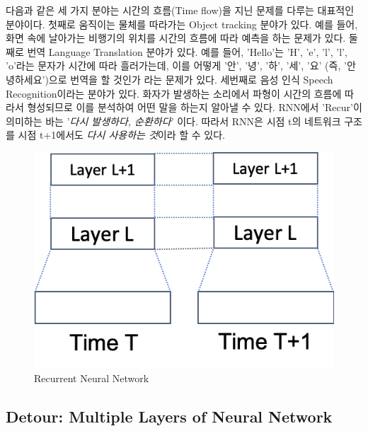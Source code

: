 \documentclass[draft=false]{oblivoir}
\begin{document}
다음과 같은 세 가지 분야는 시간의 흐름(Time flow)을 지닌 문제를 다루는 대표적인 분야이다. 첫째로 움직이는 물체를 따라가는 Object tracking 분야가 있다. 예를 들어, 화면 속에 날아가는 비행기의 위치를 시간의 흐름에 따라 예측을 하는 문제가 있다. 둘째로 번역 Language Translation 분야가 있다. 예를 들어, 'Hello'는 'H', 'e', 'l', 'l', 'o'라는 문자가 시간에 따라 흘러가는데, 이를 어떻게  '안', '녕', '하', '세', '요' (즉, '안녕하세요')으로 번역을 할 것인가 라는 문제가 있다. 세번째로 음성 인식 Speech Recognition이라는 분야가 있다. 화자가 발생하는 소리에서 파형이 시간의 흐름에 따라서 형성되므로 이를 분석하여 어떤 말을 하는지 알아낼 수 있다. RNN에서 'Recur'이 의미하는 바는  '\textit{다시 발생하다, 순환하다}' 이다. 따라서 RNN은 시점 t의 네트워크 구조를 시점 t+1에서도 \textit{다시 사용하는 것}이라 할 수 있다. 

\begin{figure}[ht] \centering 
  \includegraphics[scale=0.7]{fig2.png}
  \caption{Recurrent Neural Network}
  \label{fig:16-2}
\end{figure}

\subsection{Detour: Multiple Layers of Neural Network}
\end{document}
